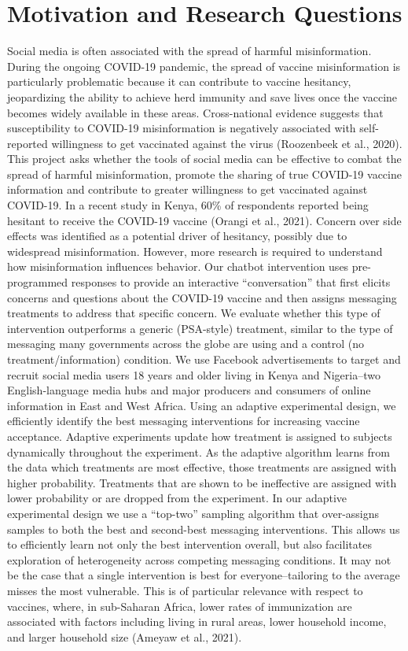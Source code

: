 \documentclass[letterpaper, 12pt, parskip=full,DIV=10]{scrartcl}
\begin{document}
\section{Motivation and Research Questions}
Social media is often associated with the spread of harmful misinformation. During the ongoing COVID-19 pandemic, the spread of vaccine misinformation is particularly problematic because it can contribute to vaccine hesitancy, jeopardizing the ability to achieve herd immunity and save lives once the vaccine becomes widely available in these areas. Cross-national evidence suggests that susceptibility to COVID-19 misinformation is negatively associated with self-reported willingness to get vaccinated against the virus (Roozenbeek et al., 2020). This project asks whether the tools of social media can be effective to combat the spread of harmful misinformation, promote the sharing of true COVID-19 vaccine information and contribute to greater willingness to get vaccinated against COVID-19. 
In a recent study in Kenya, 60\% of respondents reported being hesitant to receive the COVID-19 vaccine (Orangi et al., 2021). Concern over side effects was identified as a potential driver of hesitancy, possibly due to widespread misinformation. However, more research is required to understand how misinformation influences behavior. Our chatbot intervention uses pre-programmed responses to provide an interactive “conversation” that first elicits concerns and questions about the COVID-19 vaccine and then assigns messaging treatments to address that specific concern. We evaluate whether this type of intervention outperforms a generic (PSA-style) treatment, similar to the type of messaging many governments across the globe are using and a control (no treatment/information) condition.
We use Facebook advertisements to target and recruit social media users 18 years and older living in Kenya and Nigeria--two English-language media hubs and major producers and consumers of online information in East and West Africa. Using an adaptive experimental design, we efficiently identify the best messaging interventions for increasing vaccine acceptance. Adaptive experiments update how treatment is assigned to subjects dynamically throughout the experiment. As the adaptive algorithm learns from the data which treatments are most effective, those treatments are assigned with higher probability. Treatments that are shown to be ineffective are assigned with lower probability or are dropped from the experiment. 
In our adaptive experimental design we use a “top-two” sampling algorithm that over-assigns samples to both the best and second-best messaging interventions. This allows us to efficiently learn not only the best intervention overall, but also facilitates exploration of heterogeneity across competing messaging conditions. It may not be the case that a single intervention is best for everyone--tailoring to the average misses the most vulnerable. This is of particular relevance with respect to vaccines, where, in sub-Saharan Africa, lower rates of immunization are associated with factors including living in rural areas, lower household income, and larger household size (Ameyaw et al., 2021). 
\end{document}

